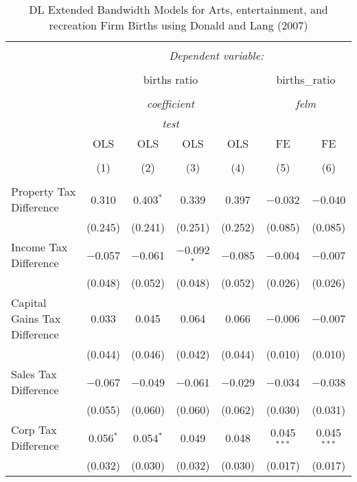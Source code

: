 
\begin{table}[!htbp] \centering 
  \caption{DL Extended Bandwidth Models for  Arts, entertainment, and recreation Firm Births using Donald and Lang (2007)} 
  \label{} 
\begin{tabular}{@{\extracolsep{5pt}}lcccccc} 
\\[-1.8ex]\hline 
\hline \\[-1.8ex] 
 & \multicolumn{6}{c}{\textit{Dependent variable:}} \\ 
\cline{2-7} 
\\[-1.8ex] & \multicolumn{4}{c}{births ratio} & \multicolumn{2}{c}{births\_ratio} \\ 
\\[-1.8ex] & \multicolumn{4}{c}{\textit{coefficient}} & \multicolumn{2}{c}{\textit{felm}} \\ 
 & \multicolumn{4}{c}{\textit{test}} & \multicolumn{2}{c}{\textit{}} \\ 
 & OLS & OLS & OLS & OLS & FE & FE \\ 
\\[-1.8ex] & (1) & (2) & (3) & (4) & (5) & (6)\\ 
\hline \\[-1.8ex] 
 Property Tax Difference & 0.310 & 0.403$^{*}$ & 0.339 & 0.397 & $-$0.032 & $-$0.040 \\ 
  & (0.245) & (0.241) & (0.251) & (0.252) & (0.085) & (0.085) \\ 
  Income Tax Difference & $-$0.057 & $-$0.061 & $-$0.092$^{*}$ & $-$0.085 & $-$0.004 & $-$0.007 \\ 
  & (0.048) & (0.052) & (0.048) & (0.052) & (0.026) & (0.026) \\ 
  Capital Gains Tax Difference & 0.033 & 0.045 & 0.064 & 0.066 & $-$0.006 & $-$0.007 \\ 
  & (0.044) & (0.046) & (0.042) & (0.044) & (0.010) & (0.010) \\ 
  Sales Tax Difference & $-$0.067 & $-$0.049 & $-$0.061 & $-$0.029 & $-$0.034 & $-$0.038 \\ 
  & (0.055) & (0.060) & (0.060) & (0.062) & (0.030) & (0.031) \\ 
  Corp Tax Difference & 0.056$^{*}$ & 0.054$^{*}$ & 0.049 & 0.048 & 0.045$^{***}$ & 0.045$^{***}$ \\ 
  & (0.032) & (0.030) & (0.032) & (0.030) & (0.017) & (0.017) \\ 

\end{tabular}
\end{table}
